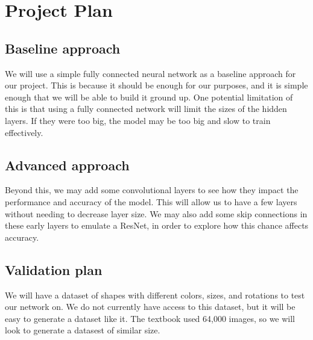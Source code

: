 \documentclass{article}
\begin{document}
\section{Project Plan}
\subsection{Baseline approach}

We will use a simple fully connected neural network as a baseline approach for our project. This is because it should be enough for our purposes, and it is simple enough that we will be able to build it ground up.  One potential limitation of this is that using a fully connected network will limit the sizes of the hidden layers.  If they were too big, the model may be too big and slow to train effectively.

\subsection{Advanced approach}

Beyond this, we may add some convolutional layers to see how they impact the performance and accuracy of the model. This will allow us to have a few layers without needing to decrease layer size.  We may also add some skip connections in these early layers to emulate a ResNet, in order to explore how this chance affects accuracy.

\subsection{Validation plan}

We will have a dataset of shapes with different colors, sizes, and rotations to test our network on.  We do not currently have access to this dataset, but it will be easy to generate a dataset like it.  The textbook used 64,000 images, so we will look to generate a datasest of similar size.
\end{document}
